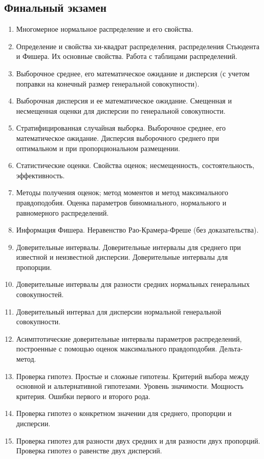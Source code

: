 \subsection*{Финальный экзамен}
\begin{enumerate}

\item Многомерное нормальное распределение и его свойства.
\item Определение и свойства хи-квадрат распределения, распределения Стьюдента и Фишера. Их основные свойства. Работа с таблицами распределений.
\item Выборочное среднее, его математическое ожидание и дисперсия (с учетом поправки на конечный размер генеральной совокупности).
\item Выборочная дисперсия и ее математическое ожидание. Смещенная и несмещенная оценки для дисперсии по генеральной совокупности.
\item Стратифицированная случайная выборка. Выборочное среднее, его математическое ожидание. Дисперсия выборочного среднего при оптимальном и при пропорциональном размещении.
\item Статистические оценки. Свойства оценок; несмещенность, состоятельность, эффективность.
\item Методы получения оценок; метод моментов и метод максимального правдоподобия. Оценка параметров биномиального, нормального и равномерного распределений.
\item Информация Фишера. Неравенство Рао-Крамера-Фреше (без доказательства).
\item Доверительные интервалы. Доверительные интервалы для среднего при известной и неизвестной дисперсии. Доверительные интервалы для пропорции.
\item Доверительные интервалы для разности средних нормальных генеральных совокупностей.
\item Доверительный интервал для дисперсии нормальной генеральной совокупности.
\item Асимптотические доверительные интервалы параметров распределений, построенные с помощью оценок максимального правдоподобия.  Дельта-метод.
\item Проверка гипотез. Простые и сложные гипотезы. Критерий выбора между основной и альтернативной гипотезами. Уровень значимости. Мощность критерия. Ошибки первого и второго рода.
\item Проверка гипотез о конкретном значении для среднего, пропорции и дисперсии.
\item Проверка гипотез для разности двух средних и для разности двух пропорций. Проверка гипотез о равенстве двух дисперсий.

\end{enumerate}

